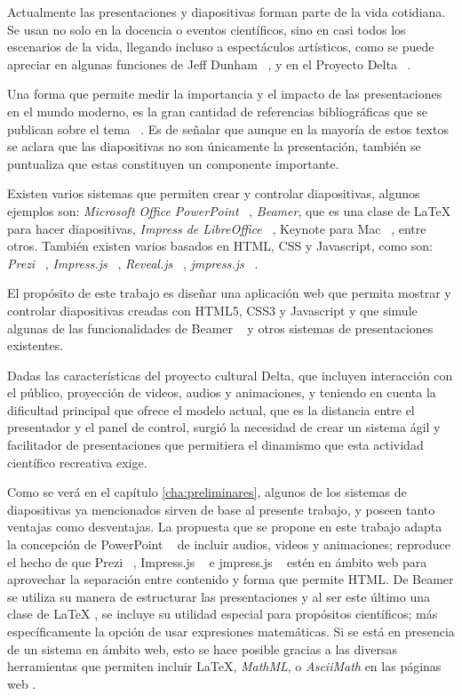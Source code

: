 \begin{introduction}

	Actualmente las presentaciones y diapositivas forman parte de la vida cotidiana. Se usan no solo en la docencia o eventos científicos, sino en casi todos los escenarios de la vida, llegando incluso a espectáculos artísticos, como se puede apreciar en algunas funciones de Jeff Dunham ~\cite{dunham}, y en el Proyecto Delta ~\cite{delta}.


	Una forma que permite medir la importancia y el impacto de las presentaciones en el mundo moderno, es la gran cantidad de referencias bibliográficas que se publican sobre el tema ~\cite{alley, duarte, tufte}. Es de señalar que aunque en la mayoría de estos textos se aclara que las diapositivas no son únicamente la presentación, también se puntualiza que estas constituyen un componente importante.


	Existen varios sistemas que permiten crear y controlar diapositivas, algunos ejemplos son: \textit{Microsoft Office PowerPoint} ~\cite{powerpoint}, \textit{Beamer}, que es una clase de \LaTeX{} para hacer diapositivas, \textit{Impress de LibreOffice} ~\cite{libreoffice}, Keynote para Mac ~\cite{keynote}, entre otros. También existen varios basados en HTML, CSS y Javascript, como son: \textit{Prezi} ~\cite{prezi}, \textit{Impress.js} ~\cite{impress}, \textit{Reveal.js} ~\cite{reveal}, \textit{jmpress.js} ~\cite{jmpress}.

	El propósito de este trabajo es diseñar una aplicación web que permita mostrar y controlar diapositivas creadas con HTML5, CSS3 y Javascript y que simule algunas de las funcionalidades de Beamer ~\cite{beamer} y otros sistemas de presentaciones existentes.

	Dadas las características del proyecto cultural Delta, que incluyen interacción con el público, proyección de videos, audios y animaciones, y teniendo en cuenta la dificultad principal que ofrece el modelo actual, que es la distancia entre el presentador y el panel de control, surgió la necesidad de crear un sistema ágil y facilitador de presentaciones que permitiera el dinamismo que esta actividad científico recreativa exige.

	Como se verá en el capítulo \ref{cha:preliminares}, algunos de los sistemas de diapositivas ya mencionados sirven de base al presente trabajo, y poseen tanto ventajas como desventajas. La propuesta que se propone en este trabajo adapta la concepción de PowerPoint ~\cite{powerpoint} de incluir audios, videos y animaciones; reproduce el hecho de que Prezi ~\cite{prezi}, Impress.js ~\cite{impress} e jmpress.js ~\cite{jmpress} estén en ámbito web para aprovechar la separación entre contenido y forma que permite HTML. De Beamer se utiliza su manera de estructurar las presentaciones y al ser este último una clase de \LaTeX{} \cite{latex}, se incluye su utilidad especial para propósitos científicos; más específicamente la opción de usar expresiones matemáticas. Si se está en presencia de un sistema en ámbito web, esto se hace posible gracias a las diversas herramientas que permiten incluir \LaTeX, \textit{MathML}, o \textit{AsciiMath} en las páginas web \cite{mathjax, katex, phpmath}. 



\end{introduction}
